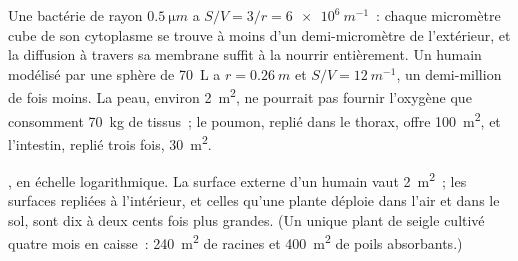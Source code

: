 \begin{example}\label{ex:b1:organism-environment:svnumbers}
Une bactérie de rayon $\qty{0.5}{\micro m}$ a
$S/V = 3/r = \qty{6e6}{m^{-1}}$~: chaque micromètre cube de son
cytoplasme se trouve à moins d'un demi-micromètre de l'extérieur, et la
diffusion à travers sa membrane suffit à la nourrir entièrement. Un
humain modélisé par une sphère de \qty{70}{L} a $r = \qty{0.26}{m}$ et
$S/V = \qty{12}{m^{-1}}$, un demi-million de fois moins. La peau,
environ \qty{2}{m^2}, ne pourrait pas fournir l'oxygène que consomment
\qty{70}{kg} de tissus~; le poumon, replié dans le thorax, offre
\qty{100}{m^2}, et l'intestin, replié trois fois, \qty{30}{m^2}.
\end{example}

\begin{omfigure}

{\small {}, en échelle logarithmique. La surface externe
d'un humain vaut \qty{2}{m^2}~; les surfaces repliées à l'intérieur, et
celles qu'une plante déploie dans l'air et dans le sol, sont dix à deux
cents fois plus grandes. (Un unique plant de seigle cultivé quatre mois
en caisse~: \qty{240}{m^2} de racines et \qty{400}{m^2} de poils
absorbants.)}
\end{omfigure}

